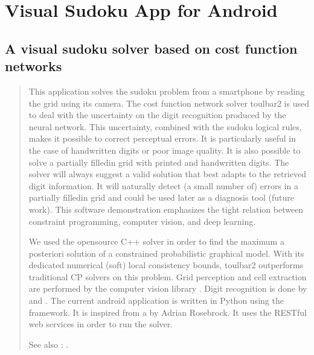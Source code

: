 \documentclass[letterpaper,10pt,openany,oneside,english]{sphinxmanual}
\begin{document}
\sphinxstepscope


\section{Visual Sudoku App for Android}
\label{\detokenize{examples/vsapp_apk:visual-sudoku-app-for-android}}\label{\detokenize{examples/vsapp_apk:vs-app-apk}}\label{\detokenize{examples/vsapp_apk::doc}}



\subsection{A visual sudoku solver based on cost function networks}
\label{\detokenize{examples/vsapp_apk:a-visual-sudoku-solver-based-on-cost-function-networks}}\begin{quote}

\sphinxAtStartPar
This application solves the sudoku problem from a smartphone by reading the
grid using its camera. The cost function network solver toulbar2 is used to
deal with the uncertainty on the digit recognition produced by the neural
network. This uncertainty, combined with the sudoku logical rules, makes it
possible to correct perceptual errors. It is particularly useful in the case
of hand\sphinxhyphen{}written digits or poor image quality. It is also possible to solve a
partially filled\sphinxhyphen{}in grid with printed and hand\sphinxhyphen{}written digits. The solver
will always suggest a valid solution that best adapts to the retrieved digit
information. It will naturally detect (a small number of) errors in a
partially filled\sphinxhyphen{}in grid and could be used later as a diagnosis tool (future
work). This software demonstration emphasizes the tight relation between
constraint programming, computer vision, and deep learning.

\sphinxAtStartPar
We used the open\sphinxhyphen{}source C++ solver
 in order to find the
maximum a posteriori solution of a constrained probabilistic graphical model.
With its dedicated numerical (soft) local consistency bounds, toulbar2
outperforms traditional CP solvers on this problem. Grid perception and cell
extraction are performed by the computer vision library
. Digit recognition is done by  and
. The current android application is written in Python using
the  framework. It is inspired from a
by Adrian Rosebrock. It uses the  RESTful web
services in order to run the solver.

\sphinxAtStartPar
See also : {\hyperref[\detokenize{examples/vsapp:vs-app}]{}}.
\end{quote}
\end{document}
